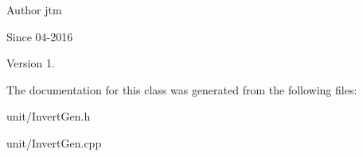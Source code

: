 \begin{DoxyAuthor}{Author}
jtm 
\end{DoxyAuthor}
\begin{DoxySince}{Since}
04-\/2016 
\end{DoxySince}
\begin{DoxyVersion}{Version}
1. 
\end{DoxyVersion}


The documentation for this class was generated from the following files\+:\begin{DoxyCompactItemize}
\item 
unit/Invert\+Gen.\+h\item 
unit/Invert\+Gen.\+cpp\end{DoxyCompactItemize}
